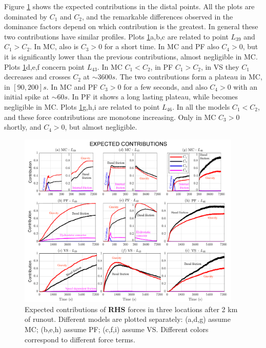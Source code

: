 \documentclass{article}
\begin{document}
Figure \ref{fig:Colima-Ci_2} shows the expected contributions in the distal points. All the plots are dominated by $C_1$ and $C_2$, and the remarkable differences observed in the dominance factors depend on which contribution is the greatest. In general these two contributions have similar profiles. Plots \ref{fig:Colima-Ci_2}a,b,c are related to point $L_{39}$ and $C_1>C_2$. In MC, also is $C_3>0$ for a short time. In MC and PF also $C_4>0$, but it is significantly lower than the previous contributions, almost negligible in MC. Plots \ref{fig:Colima-Ci_2}d,e,f concern point $L_{43}$. In MC $C_1<C_2$, in PF $C_1>C_2$, in VS they $C_1$ decreases and crosses $C_2$ at $\sim 3600 s$. The two contributions form a plateau in MC, in $[90, 200] s$. In MC and PF $C_3>0$ for a few seconds, and also $C_4>0$ with an initial spike at $\sim 60s$. In PF it shows a long lasting plateau, while becomes negligible in MC. Plots \ref{fig:Colima-Ci_2}g,h,i are related to point $L_{46}$. In all the models $C_1<C_2$, and these force contributions are monotone increasing. Only in MC $C_3>0$ shortly, and $C_4>0$, but almost negligible.
\begin{figure}[H]
         \centering
        \includegraphics[width=0.95\textwidth]{figures/Colima/Ci2_total.png}
        \caption{Expected contributions of \textbf{RHS} forces in three locations after 2 km of runout. Different models are plotted separately: (a,d,g) assume MC; (b,e,h) assume PF; (c,f,i) assume VS. Different colors correspond to different force terms.}
        \label{fig:Colima-Ci_2}
\end{figure}
\end{document}

